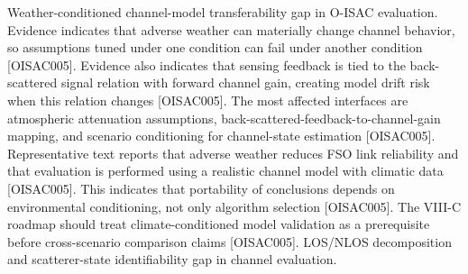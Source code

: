 {}
\markdownRendererSectionEnd \markdownRendererSectionBegin
{}\markdownRendererInterblockSeparator
{}\markdownRendererOlBegin
{} Weather-conditioned channel-model transferability gap in O-ISAC evaluation.\markdownRendererOlItemEnd 
{} Evidence indicates that adverse weather can materially change channel behavior, so assumptions tuned under one condition can fail under another condition [O\markdownRendererUnderscore{}ISAC\markdownRendererUnderscore{}005]. Evidence also indicates that sensing feedback is tied to the back-scattered signal relation with forward channel gain, creating model drift risk when this relation changes [O\markdownRendererUnderscore{}ISAC\markdownRendererUnderscore{}005].\markdownRendererOlItemEnd 
{} The most affected interfaces are atmospheric attenuation assumptions, back-scattered-feedback-to-channel-gain mapping, and scenario conditioning for channel-state estimation [O\markdownRendererUnderscore{}ISAC\markdownRendererUnderscore{}005].\markdownRendererOlItemEnd 
{} Representative text reports that adverse weather reduces FSO link reliability and that evaluation is performed using a realistic channel model with climatic data [O\markdownRendererUnderscore{}ISAC\markdownRendererUnderscore{}005]. This indicates that portability of conclusions depends on environmental conditioning, not only algorithm selection [O\markdownRendererUnderscore{}ISAC\markdownRendererUnderscore{}005].\markdownRendererOlItemEnd 
{} The VIII-C roadmap should treat climate-conditioned model validation as a prerequisite before cross-scenario comparison claims [O\markdownRendererUnderscore{}ISAC\markdownRendererUnderscore{}005].\markdownRendererOlItemEnd 
\markdownRendererOlEnd \markdownRendererInterblockSeparator
{}
\markdownRendererSectionEnd \markdownRendererSectionBegin
{}\markdownRendererInterblockSeparator
{}\markdownRendererOlBegin
{} LOS/NLOS decomposition and scatterer-state identifiability gap in channel evaluation.\markdownRendererOlItemEnd 
